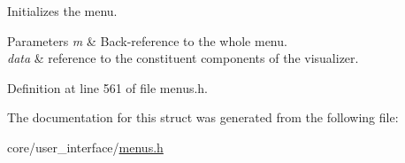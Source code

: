 Initializes the menu. 


\begin{DoxyParams}{Parameters}
{\em m} & Back-\/reference to the whole menu. \\
\hline
{\em data} & reference to the constituent components of the visualizer. \\
\hline
\end{DoxyParams}


Definition at line 561 of file menus.\+h.



The documentation for this struct was generated from the following file\+:\begin{DoxyCompactItemize}
\item 
core/user\+\_\+interface/\hyperlink{menus_8h}{menus.\+h}\end{DoxyCompactItemize}
